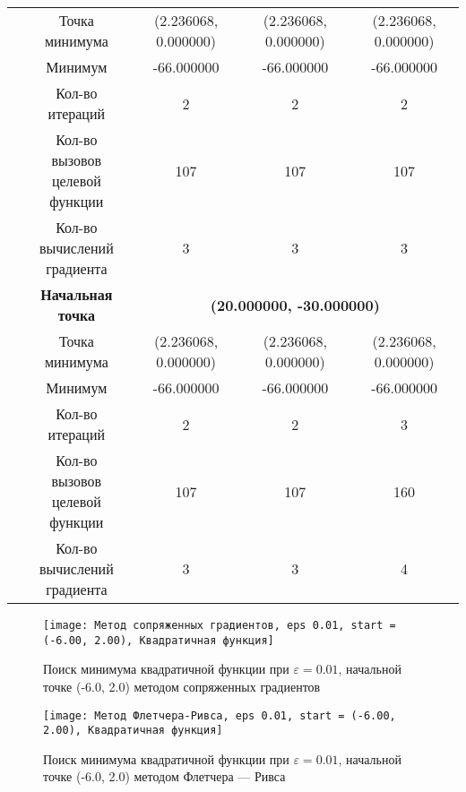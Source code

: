 \begin{table}[H]
\begin{tabular}{|c|c|c|c|c|}
	\cline{2-5}
	&Точка минимума &(2.236068, 0.000000) &(2.236068, 0.000000) &(2.236068, 0.000000) \\ 
	\cline{2-5}
	&Минимум &-66.000000 &-66.000000 &-66.000000 \\ 
	\cline{2-5}
	&Кол-во итераций &2 &2 &2 \\ 
	\cline{2-5}
	&\makecell{Кол-во вызовов\\целевой функции} &107 &107 &107 \\ 
	\cline{2-5}
	&\makecell{Кол-во вычислений\\градиента} &3 &3 &3 \\ 
	\cline{2-5}
\cline{2-5}&\textbf{Начальная точка} &\multicolumn{3}{c|}{\textbf{(20.000000, -30.000000)}}\\
	\cline{2-5}
	&Точка минимума &(2.236068, 0.000000) &(2.236068, 0.000000) &(2.236068, 0.000000) \\ 
	\cline{2-5}
	&Минимум &-66.000000 &-66.000000 &-66.000000 \\ 
	\cline{2-5}
	&Кол-во итераций &2 &2 &3 \\ 
	\cline{2-5}
	&\makecell{Кол-во вызовов\\целевой функции} &107 &107 &160 \\ 
	\cline{2-5}
	&\makecell{Кол-во вычислений\\градиента} &3 &3 &4 \\ 
	\cline{2-5}
	\hline

\end{tabular}
\end{table}


            \begin{figure}[H]
	        \centering
	        \texttt{[image: Метод сопряженных градиентов, eps 0.01, start = (-6.00, 2.00), Квадратичная функция]}%
	        \caption{Поиск минимума квадратичной функции при $\varepsilon = 0.01$, начальной точке (-6.0, 2.0) методом сопряженных градиентов}
	        \vspace*{-1.2cm}
            \end{figure}
            
            \begin{figure}[H]
	        \centering
	        \texttt{[image: Метод Флетчера-Ривса, eps 0.01, start = (-6.00, 2.00), Квадратичная функция]}%
	        \caption{Поиск минимума квадратичной функции при $\varepsilon = 0.01$, начальной точке (-6.0, 2.0) методом Флетчера --- Ривса}
	        \vspace*{-1.2cm}
            \end{figure}
            
